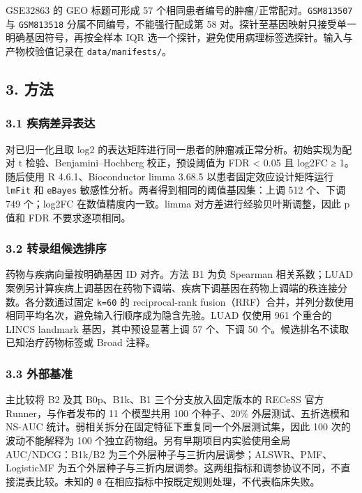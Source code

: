 \documentclass[
  10pt,
]{ctexart}
\begin{document}
GSE32863 的 GEO 标题可形成 57
个相同患者编号的肿瘤/正常配对。\texttt{GSM813507} 与 \texttt{GSM813518}
分属不同编号，不能强行配成第 58
对。探针至基因映射只接受单一明确基因符号，再按全样本 IQR
选一个探针，避免使用病理标签选探针。输入与产物校验值记录在
\texttt{data/\allowbreak{}manifests/\allowbreak{}}。

\subsection{3. 方法}\label{3-ux65b9ux6cd5}

\subsubsection{3.1
疾病差异表达}\label{31-ux75beux75c5ux5deeux5f02ux8868ux8fbe}

对已归一化且取 log2
的表达矩阵进行同一患者的肿瘤减正常分析。初始实现为配对 t
检验、Benjamini--Hochberg 校正，预设阈值为 FDR \textless{} 0.05 且
\textbar log2FC\textbar{} ≥ 1。随后使用 R 4.6.1、Bioconductor limma
3.68.5 以患者固定效应设计矩阵运行 \texttt{lmFit} 和 \texttt{eBayes}
敏感性分析。两者得到相同的阈值基因集：上调 512 个、下调 749 个；log2FC
在数值精度内一致。limma 对方差进行经验贝叶斯调整，因此 p 值和 FDR
不要求逐项相同。

\subsubsection{3.2
转录组候选排序}\label{32-ux8f6cux5f55ux7ec4ux5019ux9009ux6392ux5e8f}

药物与疾病向量按明确基因 ID 对齐。方法 B1 为负 Spearman 相关系数；LUAD
案例另计算疾病上调基因在药物下调端、疾病下调基因在药物上调端的秩连接分数。各分数通过固定
\texttt{k=60} 的 reciprocal-rank
fusion（RRF）合并，并列分数使用相同平均名次，避免输入行顺序成为隐含先验。LUAD
仅使用 961 个重合的 LINCS landmark 基因，其中预设显著上调 57 个、下调 50
个。候选排名不读取已知治疗药物标签或 Broad 注释。

\subsubsection{3.3 外部基准}\label{33-ux5916ux90e8ux57faux51c6}

主比较将 B2 及其 B0p、B1k、B1 三个分支放入固定版本的 RECeSS 官方
Runner，与作者发布的 11 个模型共用 100 个种子、20\% 外层测试、五折选模和
NS-AUC 统计。弱相关拆分在固定特征下重复同一个外层测试集，因此 100
次的波动不能解释为 100 个独立药物组。另有早期项目内实验使用全局
AUC/NDCG：B1k/B2 为三个外层种子与三折内层调参；ALSWR、PMF、LogisticMF
为五个外层种子与三折内层调参。这两组指标和调参协议不同，不直接混表比较。未知的
\texttt{0} 在相应指标中按既定规则处理，不代表临床失败。
\end{document}
